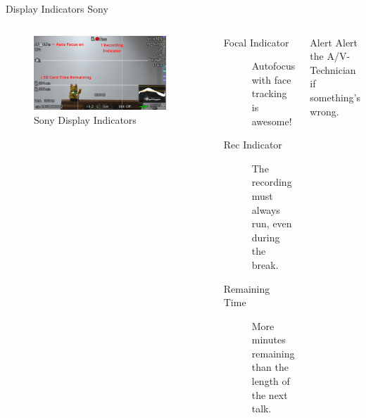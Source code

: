 \begin{frame}{Display Indicators Sony}
	\begin{columns}[T,onlytextwidth]
	\begin{figure}
		\centering
		\includegraphics[width=0.9\textwidth]{images/sony-display-description.jpg}
		\caption{Sony Display Indicators}
	\end{figure}
		\begin{description}
			\item[Focal Indicator] Autofocus with face tracking is awesome!
			\item[Rec Indicator] The recording must always run, even during the break.
			\item[Remaining Time] More minutes remaining than the length of the next talk.
		\end{description}
		\begin{alertblock}{Alert}
			Alert the A/V-Technician if something's wrong.
		\end{alertblock}
	\end{columns}
\end{frame}
